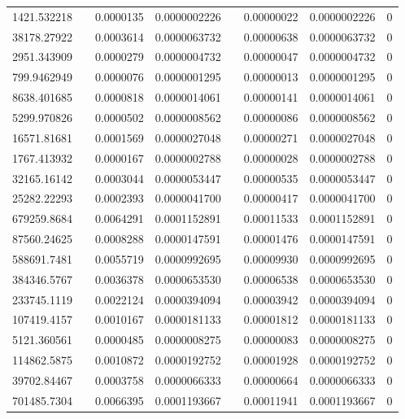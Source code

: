 \documentclass[
journal=jacsat, %
manuscript=article]{achemso}
\begin{document}
\begin{table}[htbp]
{\begin{tabular}{rrrrrrrr}
    1421.532218 &       & 0.0000135 & 0.0000002226 &       & 0.00000022 & 0.0000002226 & 0 \\
    38178.27922 &       & 0.0003614 & 0.0000063732 &       & 0.00000638 & 0.0000063732 & 0 \\
    2951.343909 &       & 0.0000279 & 0.0000004732 &       & 0.00000047 & 0.0000004732 & 0 \\
    799.9462949 &       & 0.0000076 & 0.0000001295 &       & 0.00000013 & 0.0000001295 & 0 \\
    8638.401685 &       & 0.0000818 & 0.0000014061 &       & 0.00000141 & 0.0000014061 & 0 \\
    5299.970826 &       & 0.0000502 & 0.0000008562 &       & 0.00000086 & 0.0000008562 & 0 \\
    16571.81681 &       & 0.0001569 & 0.0000027048 &       & 0.00000271 & 0.0000027048 & 0 \\
    1767.413932 &       & 0.0000167 & 0.0000002788 &       & 0.00000028 & 0.0000002788 & 0 \\
    32165.16142 &       & 0.0003044 & 0.0000053447 &       & 0.00000535 & 0.0000053447 & 0 \\
    25282.22293 &       & 0.0002393 & 0.0000041700 &       & 0.00000417 & 0.0000041700 & 0 \\
    679259.8684 &       & 0.0064291 & 0.0001152891 &       & 0.00011533 & 0.0001152891 & 0 \\
    87560.24625 &       & 0.0008288 & 0.0000147591 &       & 0.00001476 & 0.0000147591 & 0 \\
    588691.7481 &       & 0.0055719 & 0.0000992695 &       & 0.00009930 & 0.0000992695 & 0 \\
    384346.5767 &       & 0.0036378 & 0.0000653530 &       & 0.00006538 & 0.0000653530 & 0 \\
    233745.1119 &       & 0.0022124 & 0.0000394094 &       & 0.00003942 & 0.0000394094 & 0 \\
    107419.4157 &       & 0.0010167 & 0.0000181133 &       & 0.00001812 & 0.0000181133 & 0 \\
    5121.360561 &       & 0.0000485 & 0.0000008275 &       & 0.00000083 & 0.0000008275 & 0 \\
    114862.5875 &       & 0.0010872 & 0.0000192752 &       & 0.00001928 & 0.0000192752 & 0 \\
    39702.84467 &       & 0.0003758 & 0.0000066333 &       & 0.00000664 & 0.0000066333 & 0 \\
    701485.7304 &       & 0.0066395 & 0.0001193667 &       & 0.00011941 & 0.0001193667 & 0 \\

\end{tabular}}
\end{table}
\end{document}

